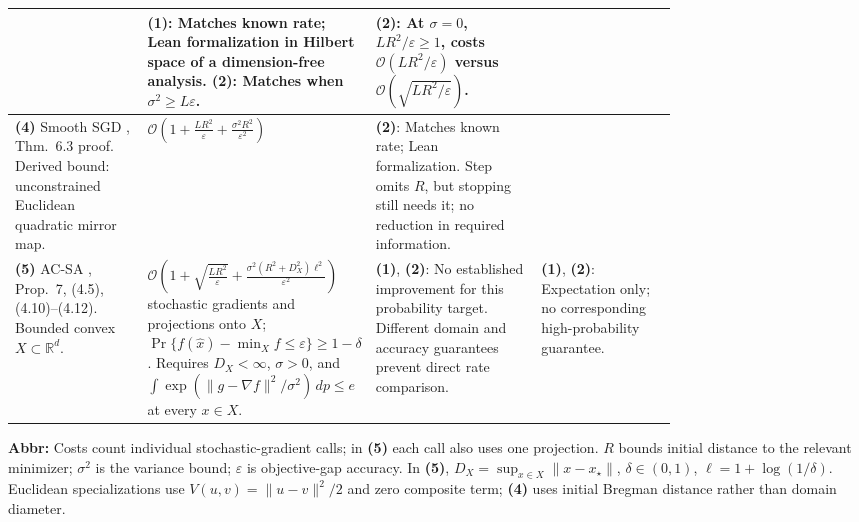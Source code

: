 \begin{table}[tp]
\begin{threeparttable}
\begin{tabularx}{\linewidth}{@{}>{\raggedright\arraybackslash}p{0.20\linewidth}>{\raggedright\arraybackslash}p{0.32\linewidth}>{\raggedright\arraybackslash}p{0.25\linewidth}>{\raggedright\arraybackslash}X@{}}
& \textbf{(1)}: Matches known rate; Lean formalization in Hilbert space of a dimension-free analysis. \textbf{(2)}: Matches when $\sigma^2\ge L\varepsilon$.
& \textbf{(2)}: At $\sigma=0$, $LR^2/\varepsilon\ge1$, costs $\mathcal{O}(LR^2/\varepsilon)$ versus $\mathcal{O}(\sqrt{LR^2/\varepsilon})$. \\
\midrule
\textbf{(4)} Smooth SGD \citep{sscBubeck2015v2}, Thm.~6.3 proof. Derived bound: unconstrained Euclidean quadratic mirror map.
& $\mathcal{O}\!\left(1+\frac{LR^2}{\varepsilon}+\frac{\sigma^2R^2}{\varepsilon^2}\right)$
& \textbf{(2)}: Matches known rate; Lean formalization. Step omits $R$, but stopping still needs it; no reduction in required information.
& \\
\midrule
\textbf{(5)} AC-SA \citep{sscGhadimiLan2012}, Prop.~7, (4.5), (4.10)--(4.12). Bounded convex $X\subset\mathbb R^d$.
& $\mathcal{O}\!\left(1+\sqrt{\frac{LR^2}{\varepsilon}}+\frac{\sigma^2(R^2+D_X^2)\ell^2}{\varepsilon^2}\right)$ stochastic gradients and projections onto $X$; $\Pr\{f(\widehat x)-\min_X f\le\varepsilon\}\ge1-\delta$. Requires $D_X<\infty$, $\sigma>0$, and $\int\exp(\|g-\nabla f\|^2/\sigma^2)\,dp\le e$ at every $x\in X$.
& \textbf{(1)}, \textbf{(2)}: No established improvement for this probability target. Different domain and accuracy guarantees prevent direct rate comparison.
& \textbf{(1)}, \textbf{(2)}: Expectation only; no corresponding high-probability guarantee. \\
\bottomrule
\end{tabularx}
\begin{tablenotes}[flushleft]\footnotesize
\item[] \textbf{Abbr:} Costs count individual stochastic-gradient calls; in \textbf{(5)} each call also uses one projection. $R$ bounds initial distance to the relevant minimizer; $\sigma^2$ is the variance bound; $\varepsilon$ is objective-gap accuracy. In \textbf{(5)}, $D_X=\sup_{x\in X}\|x-x_\star\|$, $\delta\in(0,1)$, $\ell=1+\log(1/\delta)$. Euclidean specializations use $V(u,v)=\|u-v\|^2/2$ and zero composite term; \textbf{(4)} uses initial Bregman distance rather than domain diameter.
\end{tablenotes}
\end{threeparttable}
\end{table}
\clearpage

